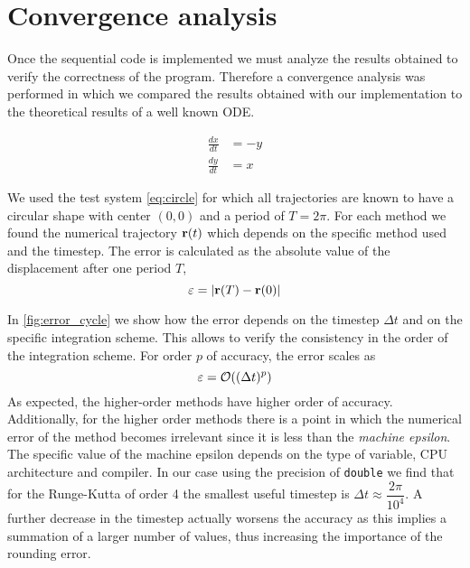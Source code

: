 
\section{Convergence analysis}%
\label{sec:convergence}

Once the sequential code is implemented we must analyze the results obtained to verify the correctness of the program. Therefore a convergence analysis was performed in which we compared the results obtained with our implementation to the theoretical results of a well known ODE.

\begin{align}\label{eq:circle}
    \frac{dx}{dt} &= -y \nonumber \\
    \frac{dy}{dt} &= x
\end{align}

We used the test system \cref{eq:circle} for which all trajectories are known to have a circular shape with center $(0,0)$ and a period of $T=2\pi$. For each method we found the numerical trajectory
${\bf r}(t)$ which depends on the specific method used and the timestep.
The error is calculated as the absolute value of the displacement after one period $T$,
\begin{equation}
\varepsilon = |{\bf r}(T)-{\bf r}(0)|
\label{Eq:epsilon:T}
\end{equation}

In \cref{fig:error_cycle} we show how the error depends on the timestep $\Delta t$ and on the specific integration scheme.
This allows to verify the consistency in the order of the integration scheme. For order $p$ of accuracy, the error scales as
\begin{equation}
\varepsilon = {\cal O}((\Delta t)^p)
\end{equation}
As expected, the higher-order methods have higher order of accuracy.
Additionally, for the higher order methods there is a point in which the numerical error of the method becomes irrelevant since it is less than the {\em machine epsilon}.
The specific value of the machine epsilon depends on the type of variable, CPU architecture and compiler.
In our case using the precision of \texttt{double} we find that for the Runge-Kutta of order 4 the smallest useful timestep is $\Delta t \approx \dfrac{2\pi}{10^4}$.
A further decrease in the timestep actually worsens the accuracy as this implies a summation of a larger number of values, thus increasing the importance of the rounding error.

